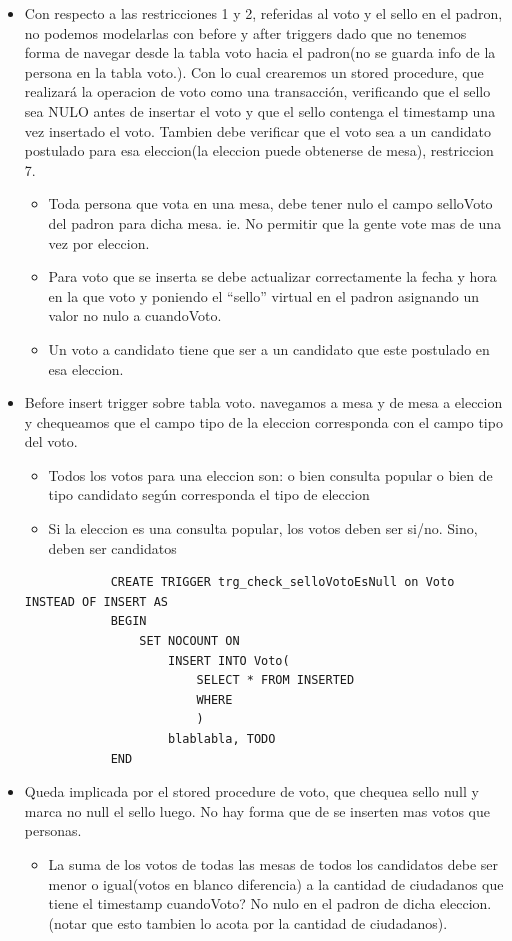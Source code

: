 \begin{itemize}
	\item Con respecto a las restricciones 1 y 2, referidas al voto y el sello en el padron, no podemos modelarlas con before y after triggers dado que no tenemos forma de navegar desde la tabla voto hacia el padron(no se guarda info de la persona en la tabla voto.). Con lo cual crearemos un stored procedure, que realizará la operacion de voto como una transacción, verificando que el sello sea NULO antes de insertar el voto y que el sello contenga el timestamp una vez insertado el voto. Tambien debe verificar que el voto sea a un candidato postulado para esa eleccion(la eleccion puede obtenerse de mesa), restriccion 7.
		\begin{itemize}
			\item Toda persona que vota en una mesa, debe tener nulo el campo selloVoto del padron para dicha mesa. ie. No permitir que la gente vote mas de una vez por eleccion.
			\item Para voto que se inserta se debe actualizar correctamente la fecha y hora en la que voto y poniendo el “sello” virtual en el padron asignando un valor no nulo a cuandoVoto.
			\item Un voto a candidato tiene que ser a un candidato que este postulado en esa eleccion.
		\end{itemize}

	\item Before insert trigger sobre tabla voto. navegamos a mesa y de mesa a eleccion y chequeamos que el campo tipo de la eleccion corresponda con el campo tipo del voto.
		\begin{itemize}
			\item Todos los votos para una eleccion son: o bien consulta popular o bien de tipo candidato según corresponda el tipo de eleccion
			\item Si la eleccion es una consulta popular, los votos deben ser si/no. Sino, deben ser candidatos
		\end{itemize}
		\begin{lstlisting}
			CREATE TRIGGER trg_check_selloVotoEsNull on Voto INSTEAD OF INSERT AS 
			BEGIN
				SET NOCOUNT ON
					INSERT INTO Voto(
						SELECT * FROM INSERTED
						WHERE 
						)
					blablabla, TODO
			END
		\end{lstlisting}
	
	\item{Queda implicada por el stored procedure de voto, que chequea sello null y marca no null el sello luego. No hay forma que de se inserten mas votos que personas}. 
		\begin{itemize}
			\item La suma de los votos de todas las mesas de todos los candidatos debe ser menor o igual(votos en blanco diferencia) a la cantidad de ciudadanos que tiene el timestamp cuandoVoto? No nulo en el padron de dicha eleccion. (notar que esto tambien lo acota por la cantidad de ciudadanos). 
		\end{itemize}


\end{itemize}
